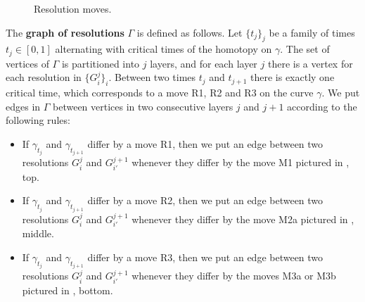 \documentclass[10pt,a4paper]{amsart}
\newcommand{\control}[2]{ ($#2+#1$) .. #1}
\begin{document}
\begin{figure}[ht]
\begin{center}
\caption{Resolution moves.}
\label{pic_resolution_moves}
\end{center}
\end{figure}

The \textbf{graph of resolutions} $\Gamma$ is defined as follows. Let $\{ t_j \}_j$ be a family of times $t_j \in [0,1]$ alternating with critical times of the homotopy on $\gamma$. The set of vertices of $\Gamma$ is partitioned into $j$ layers, and for each layer $j$ there is a vertex for each resolution in $\{ G^j_i \}_i$. Between two times $t_j$ and $t_{j+1}$ there is exactly one critical time, which corresponds to a move R1, R2 and R3 on the curve $\gamma$. We put edges in $\Gamma$ between vertices in two consecutive layers $j$ and $j+1$ according to the following rules:
\begin{itemize}
\item If $\gamma_{t_j}$ and $\gamma_{t_{j+1}}$ differ by a move R1, then we put an edge between two resolutions $G^j_i$ and $G^{j+1}_{i'}$ whenever they differ by the move M1 pictured in , top.

\item If $\gamma_{t_j}$ and $\gamma_{t_{j+1}}$ differ by a move R2, then we put an edge between two resolutions $G^j_i$ and $G^{j+1}_{i'}$ whenever they differ by the move M2a pictured in , middle. 

\item If $\gamma_{t_j}$ and $\gamma_{t_{j+1}}$ differ by a move R3, then we put an edge between two resolutions $G^j_i$ and $G^{j+1}_{i'}$ whenever they differ by the moves M3a or M3b pictured in , bottom.
  \end{itemize}
\end{document}
